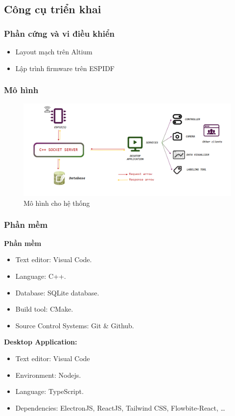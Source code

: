 \documentclass{article}
\begin{document}
\subsection{Công cụ triển khai}
\subsubsection{Phần cứng và vi điều khiển}
\begin{itemize}
    \item Layout mạch trên Altium
    \item Lập trình firmware trên ESPIDF
\end{itemize}
\subsubsection{Mô hình}
\begin{figure}[H]
    \centering
    \includegraphics[width=12cm,height=5cm]{image/anh4.png}
    \caption{Mô hình cho hệ thống} \label{EV}
\end{figure}
\subsubsection{Phần mềm}
\textbf{Phần mềm}\\
\begin{itemize}
    \item Text editor: Visual Code. 
    \item Language: C++. 
    \item Database: SQLite database. 
    \item Build tool: CMake. 
    \item Source Control Systems: Git \& Github. 
\end{itemize}
\hspace{1cm}
\textbf{Desktop Application: }
\begin{itemize}
    \item Text editor: Visual Code
    \item Environment: Nodejs. 
    \item Language: TypeScript.
    \item Dependencies: ElectronJS, ReactJS, Tailwind CSS, Flowbite-React, …
\end{itemize}
\cleardoublepage
\end{document}
